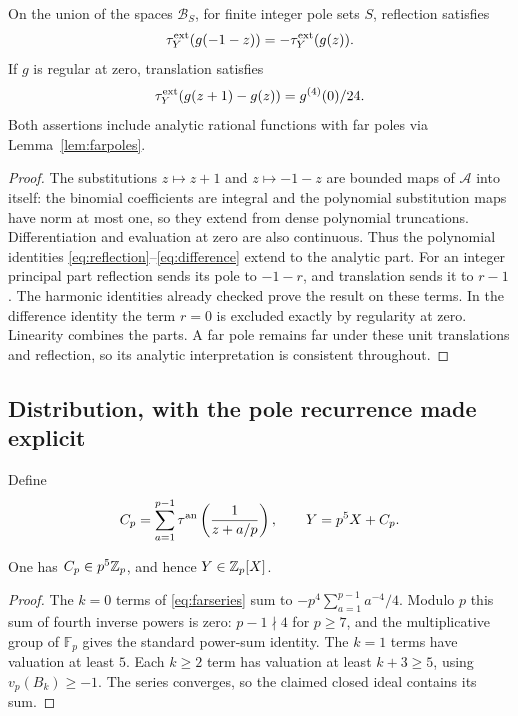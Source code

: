 \begin{lemma}
\label{lem:completedidentities}
On the union of the spaces $\mathcal B_S$, for finite integer pole sets
$S$, reflection satisfies
\[
 \tau^{\mathrm{ext}}_Y(g(-1-z))=-\tau^{\mathrm{ext}}_Y(g(z)).
\]
If $g$ is regular at zero, translation satisfies
\[
 \tau^{\mathrm{ext}}_Y(g(z+1)-g(z))=g^{(4)}(0)/24.
\]
Both assertions include analytic rational functions with far poles via
Lemma~\ref{lem:farpoles}.
\end{lemma}
\begin{proof}
The substitutions $z\mapsto z+1$ and $z\mapsto-1-z$ are bounded maps of
$\mathcal A$ into itself: the binomial coefficients are integral and the
polynomial substitution maps have norm at most one, so they extend from
dense polynomial truncations. Differentiation and evaluation at zero are
also continuous. Thus the polynomial identities
\eqref{eq:reflection}--\eqref{eq:difference} extend to the analytic part.
For an integer principal part reflection sends its pole to $-1-r$, and
translation sends it to $r-1$. The harmonic identities already checked
prove the result on these terms. In the difference identity the term
$r=0$ is excluded exactly by regularity at zero. Linearity combines the
parts. A far pole remains far under these unit translations and
reflection, so its analytic interpretation is consistent throughout.
\end{proof}

\subsection{Distribution, with the pole recurrence made explicit}
Define
\begin{equation}\label{eq:CpY}
 C_p=\sum_{a=1}^{p-1}\tau^{\mathrm{an}}\left(\frac1{z+a/p}\right),
 \qquad Y=p^5X+C_p.
\end{equation}

\begin{lemma}
\label{lem:Cp}
One has $C_p\in p^5\mathbb Z_p$, and hence $Y\in\mathbb Z_p[X]$.
\end{lemma}
\begin{proof}
The $k=0$ terms of \eqref{eq:farseries} sum to
$-p^4\sum_{a=1}^{p-1}a^{-4}/4$. Modulo $p$ this sum of fourth inverse
powers is zero: $p-1\nmid4$ for $p\ge7$, and the multiplicative group of
$\mathbb F_p$ gives the standard power-sum identity. The $k=1$ terms
have valuation at least $5$. Each $k\ge2$ term has valuation at least
$k+3\ge5$, using $v_p(B_k)\ge-1$. The series converges, so the claimed
closed ideal contains its sum.
\end{proof}

